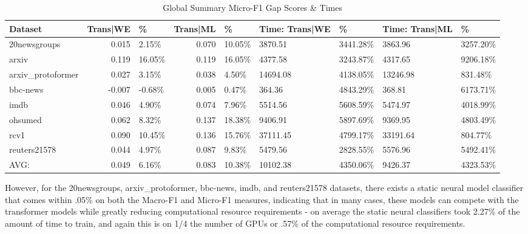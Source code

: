 \documentclass[final]{clv2025-revised}
\begin{document}
\begin{table}[h!]
\centering
\scriptsize
\caption{Global Summary Micro-F1 Gap Scores \& Times}
\label{tab:micro_f1_gap_summary}
\begin{tabular}{@{}p{1.3cm} r p{1cm} r p{1cm} p{1cm} p{1cm} p{1cm} p{1.1cm}@{}}
\toprule
\textbf{Dataset} & \textbf{Trans|WE} & \textbf{\%} & \textbf{Trans|ML} & \textbf{\%} & \textbf{Time: Trans|WE} & \textbf{\%} & \textbf{Time: Trans|ML} & \textbf{\%} \\
\midrule
20newsgroups      & 0.015 & 2.15\%  & 0.070 & 10.05\% & 3870.51 & 3441.28\% & 3863.96 & 3257.20\% \\
arxiv             & 0.119 & 16.05\% & 0.119 & 16.05\% & 4377.58 & 3243.87\% & 4317.65 & 9206.18\% \\
arxiv\_protoformer& 0.027 & 3.15\%  & 0.038 & 4.50\%  & 14694.08 & 4138.05\% & 13246.98 & 831.48\% \\
bbc-news          & -0.007 & -0.68\% & 0.005 & 0.47\% & 364.36 & 4843.29\% & 368.81 & 6173.71\% \\
imdb              & 0.046 & 4.90\%  & 0.074 & 7.96\%  & 5514.56 & 5608.59\% & 5474.97 & 4018.99\% \\
ohsumed           & 0.062 & 8.32\%  & 0.137 & 18.38\% & 9406.91 & 5897.69\% & 9369.95 & 4803.49\% \\
rcv1              & 0.090 & 10.45\% & 0.136 & 15.76\% & 37111.45 & 4799.17\% & 33191.64 & 804.77\% \\
\midrule
reuters21578      & 0.044 & 4.97\%  & 0.087 & 9.83\%  & 5479.56 & 2828.55\% & 5576.96 & 5492.41\% \\
AVG:              & 0.049 & 6.16\%  & 0.083 & 10.38\% & 10102.38 & 4350.06\% & 9426.37 & 4323.53\% \\
\bottomrule
\end{tabular}
\end{table}


However, for the 20newsgroups, arxiv\_protoformer, bbc-news, imdb, and reuters21578 datasets, there exists a static neural model classifier that comes within .05\% on both the Macro-F1 and Micro-F1 measures, indicating that in many cases, these models can compete with the transformer models while greatly reducing computational resource requirements - on average the static neural classifiers took 2.27\% of the amount of time to train, and again this is on 1/4 the number of GPUs or .57\% of the computational resource requirements.
\end{document}
